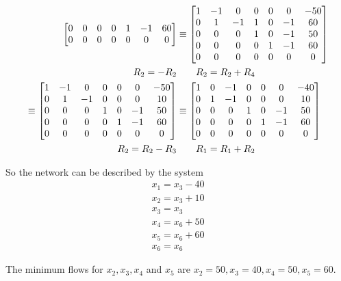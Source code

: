 \documentclass{../mathhomework}
\newenvironment{Mat}{\begin{bmatrix}}{\end{bmatrix}}
\begin{document}
\begin{problem}[1.6\#13]
\begin{solution}[Part A:]
\begin{align*}
\begin{Mat}
                0 & 0 & 0 & 0 & 1 & -1 & 60 \\
                0 & 0 & 0 & 0 & 0 & 0 & 0
            \end{Mat}
            & \equiv \begin{Mat}
                1 & -1 & 0 & 0 & 0 & 0 & -50 \\ 
                0 & 1 & -1 & 1 & 0 & -1 & 60 \\
                0 & 0 & 0 & 1 & 0 & -1 & 50 \\ 
                0 & 0 & 0 & 0 & 1 & -1 & 60 \\
                0 & 0 & 0 & 0 & 0 & 0 & 0
            \end{Mat}
            \\ 
            R_2 = -R_2 & \qquad{} R_2 = R_2 + R_4 \\ 
            \equiv \begin{Mat}
                1 & -1 & 0 & 0 & 0 & 0 & -50 \\ 
                0 & 1 & -1 & 0 & 0 & 0 & 10 \\
                0 & 0 & 0 & 1 & 0 & -1 & 50 \\ 
                0 & 0 & 0 & 0 & 1 & -1 & 60 \\
                0 & 0 & 0 & 0 & 0 & 0 & 0
            \end{Mat}
            & \equiv 
            \begin{Mat}
                1 & 0 & -1 & 0 & 0 & 0 & -40 \\ 
                0 & 1 & -1 & 0 & 0 & 0 & 10 \\
                0 & 0 & 0 & 1 & 0 & -1 & 50 \\ 
                0 & 0 & 0 & 0 & 1 & -1 & 60 \\
                0 & 0 & 0 & 0 & 0 & 0 & 0
            \end{Mat}
            \\ 
            R_2 = R_2 - R_3 & \qquad{} R_1 = R_1 + R_2
        \end{align*}

        So the network can be described by the system
        \begin{align*}
            x_1 = x_3 - 40 \\ 
            x_2 = x_3 + 10 \\ 
            x_3 = x_3 \\ 
            x_4 = x_6 + 50 \\ 
            x_5 = x_6 + 60 \\ 
            x_6 = x_6
        \end{align*}
    \end{solution}

    \begin{solution}[Part B:]
        The minimum flows for $x_2, x_3, x_4$ and $x_5$ are $x_2 = 50, x_3 = 40, x_4 = 50, x_5 = 60$.
    \end{solution}
\end{problem}
\end{document}
